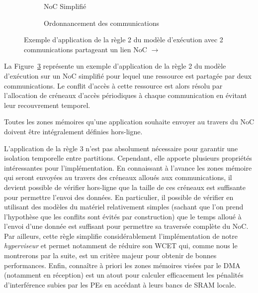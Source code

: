 \documentclass[main.tex]{subfiles}
\begin{document}
\begin{figure}
    \centering
    \begin{subfigure}[b]{0.4\linewidth}
    \centering
        \scalebox{0.7}{}
        \caption{NoC Simplifié}
        \label{fig_resumeFr_exampleRule2_noc}
    \end{subfigure}
    \begin{subfigure}[b]{0.59\linewidth}
    \centering
        
        \caption{Ordonnancement des communications}
        \label{fig_resumeFr_exampleRule2_diagram}
    \end{subfigure}
    \caption{Exemple d'application de la règle 2 du modèle d'exécution avec 2 communications partageant un lien NoC  $\to$ }
    \label{fig_resumeFr_exampleRule2}
\end{figure}

La Figure~\ref{fig_resumeFr_exampleRule2} représente un exemple d'application de la règle 2 du modèle d'exécution sur un NoC simplifié pour lequel une ressource est partagée par deux communications. Le conflit d'accès à cette ressource est alors résolu par l'allocation de créneaux d'accès périodiques à chaque communication en évitant leur recouvrement temporel.





\begin{regleem}
    \label{em_resumeFr_regle3}
    Toutes les zones mémoires qu'une application souhaite envoyer au travers du NoC doivent être intégralement définies hors-ligne.
\end{regleem}

L'application de la règle 3 n'est pas absolument nécessaire pour garantir une isolation temporelle entre partitions. Cependant, elle apporte plusieurs propriétés intéressantes pour l'implémentation. En connaissant à l'avance les zones mémoire qui seront envoyées au travers des créneaux alloués aux communications, il devient possible de vérifier hors-ligne que la taille de ces créneaux est suffisante pour permettre l'envoi des données. En particulier, il possible de vérifier en utilisant des modèles du matériel relativement simples (sachant que l'on prend l'hypothèse que les conflits sont évités par construction) que le temps alloué à l'envoi d'une donnée est suffisant pour permettre sa traversée complète du NoC. Par ailleurs, cette règle simplifie considérablement l'implémentation de notre \emph{hyperviseur} et permet notamment de réduire son WCET qui, comme nous le montrerons par la suite, est un critère majeur pour obtenir de bonnes performances. Enfin, connaître à priori les zones mémoires visées par le DMA (notamment en réception) est un atout pour calculer efficacement les pénalités d'interférence subies par les PEs en accédant à leurs bancs de SRAM locale.
\end{document}
